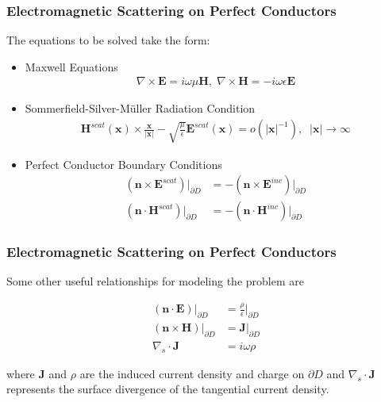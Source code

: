 \documentclass{beamer}
\newcommand{\bvec}[1]{\boldsymbol{#1}}
\begin{document}
	
	\begin{frame}
	\frametitle{Electromagnetic Scattering on Perfect Conductors}
	The equations to be solved take the form:
	
	\begin{itemize}
		\item Maxwell Equations
		\begin{align*}
		\nabla \times \bvec{E} = i \omega \mu \bvec{H}, \;\nabla \times \bvec{H} = - i \omega \epsilon \bvec{E}
		\end{align*}
		\item Sommerfield-Silver-Müller Radiation Condition
		\begin{align*}
		\bvec{H}^{scat}(\bvec{x}) \times \frac{\bvec{x}}{|\bvec{x}|} - \sqrt{\frac{\mu}{\epsilon}} \bvec{E}^{scat}(\bvec{x}) = o(|\bvec{x}|^{-1}), \;\; |\bvec{x}| \rightarrow \infty
		\end{align*}
		\item Perfect Conductor Boundary Conditions
		\begin{align*}
		\left(\bvec{n} \times \bvec{E}^{scat} \right)|_{\partial D} &= -\left( \bvec{n} \times \bvec{E}^{inc} \right)|_{\partial D} \\
		\left(\bvec{n} \cdot \bvec{H}^{scat} \right)|_{\partial D} &= -\left( \bvec{n} \cdot \bvec{H}^{inc} \right)|_{\partial D} 
		\end{align*}
	\end{itemize}
	
	\end{frame}

	\begin{frame}
	\frametitle{Electromagnetic Scattering on Perfect Conductors}
	Some other useful relationships for modeling the problem are
	
		\begin{align*}
		\left(\bvec{n} \cdot \bvec{E} \right)|_{\partial D} &= \frac{\rho}{\epsilon}|_{\partial D} \\
		\left(\bvec{n} \times \bvec{H} \right)|_{\partial D} &= \bvec{J}|_{\partial D} \\
		\nabla_s \cdot \bvec{J} &= i \omega \rho
		\end{align*}

	where $\bvec{J}$ and $\rho$ are the induced current density and charge on $\partial D$ and $\nabla_s \cdot \bvec{J}$ represents the surface divergence of the tangential current density.

	\end{frame}
\end{document}
